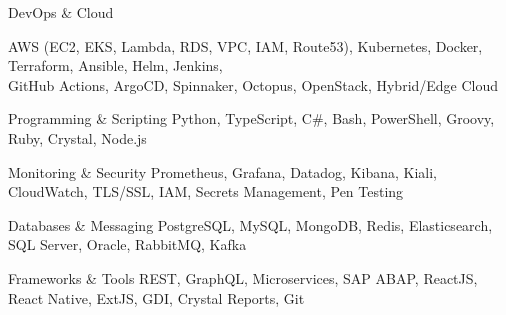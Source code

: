 
\begin{cvskills}

  \cvskill
    {DevOps \& Cloud}
    {\parbox{\linewidth}{AWS (EC2, EKS, Lambda, RDS, VPC, IAM, Route53), Kubernetes, Docker, Terraform, Ansible, Helm, Jenkins, \\
    GitHub Actions, ArgoCD, Spinnaker, Octopus, OpenStack, Hybrid/Edge Cloud}}

  \cvskill
    {Programming \& Scripting}
    {Python, TypeScript, C\#, Bash, PowerShell, Groovy, Ruby, Crystal, Node.js}

  \cvskill
    {Monitoring \& Security}
    {Prometheus, Grafana, Datadog, Kibana, Kiali, CloudWatch, TLS/SSL, IAM, Secrets Management, Pen Testing}

  \cvskill
    {Databases \& Messaging}
    {PostgreSQL, MySQL, MongoDB, Redis, Elasticsearch, SQL Server, Oracle, RabbitMQ, Kafka}

  \cvskill
    {Frameworks \& Tools}
    {REST, GraphQL, Microservices, SAP ABAP, ReactJS, React Native, ExtJS, GDI, Crystal Reports, Git}

\end{cvskills}
